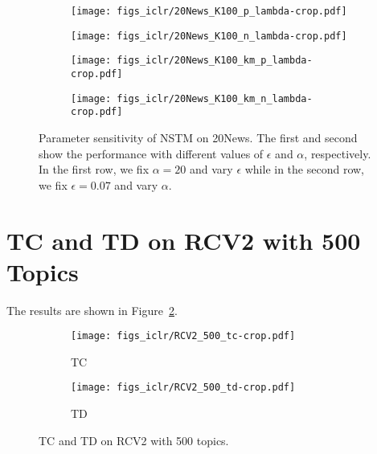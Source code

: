 \documentclass{article}
\begin{document}
\begin{figure}[t]
         \begin{subfigure}[b]{0.16\linewidth}
                 \centering
                 \texttt{[image: figs\_iclr/20News\_K100\_p\_lambda-crop.pdf]}
         \end{subfigure}\begin{subfigure}[b]{0.16\linewidth}
                 \centering
                 \texttt{[image: figs\_iclr/20News\_K100\_n\_lambda-crop.pdf]}
         \end{subfigure}
          \begin{subfigure}[b]{0.16\linewidth}
                 \centering
                 \texttt{[image: figs\_iclr/20News\_K100\_km\_p\_lambda-crop.pdf]}
         \end{subfigure}
                  \begin{subfigure}[b]{0.16\linewidth}
                 \centering
                 \texttt{[image: figs\_iclr/20News\_K100\_km\_n\_lambda-crop.pdf]}
         \end{subfigure}
\caption{Parameter sensitivity of NSTM on 20News. The first and second show the performance with different values of $\epsilon$ and $\alpha$, respectively. In the first row, we fix $\alpha=20$ and vary $\epsilon$ while in the second row, we fix $\epsilon=0.07$ and vary $\alpha$.}
\label{fig-parameter}
\end{figure}


\section{TC and TD on RCV2 with 500 Topics}
\label{a-sec-rcv-500}
The results are shown in Figure~\ref{fig-rcv-500}.


\begin{figure}[t]
        \centering
         \begin{subfigure}[b]{0.45\linewidth}
                 \centering
                 \caption{TC}
                 \texttt{[image: figs\_iclr/RCV2\_500\_tc-crop.pdf]}
         \end{subfigure}
          \hspace{0.0005\textwidth}
         \begin{subfigure}[b]{0.45\linewidth}
                 \centering
                 \caption{TD}
                 \texttt{[image: figs\_iclr/RCV2\_500\_td-crop.pdf]}
         \end{subfigure} 
\caption{TC and TD on RCV2 with 500 topics.}
\label{fig-rcv-500}
\end{figure}
\end{document}
